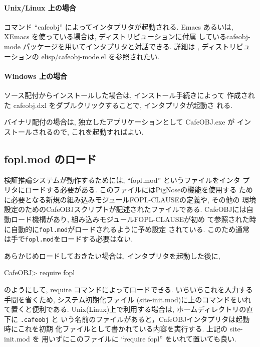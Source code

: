 \paragraph{Unix/Linux 上の場合}

コマンド ``cafeobj'' によってインタプリタが起動される.
Emacs あるいは, XEmacs を使っている場合は, ディストリビューションに付属
しているcafeobj-mode パッケージを用いてインタプリタと対話できる. 詳細は
, ディストリビューションの elisp/cafeobj-mode.el を参照されたい.

\paragraph{Windows 上の場合}

ソース配付からインストールした場合は, インストール手続きによって
作成された cafeobj.dxl をダブルクリックすることで, インタプリタが起動さ
れる. 

バイナリ配付の場合は, 独立したアプリケーションとして CafeOBJ.exe が
インストールされるので, これを起動すればよい.

\subsection{fopl.mod のロード}
\label{sec:fopl-loading}

検証推論システムが動作するためには, ``fopl.mod'' というファイルをインタ
プリタにロードする必要がある. このファイルにはPigNoseの機能を使用する
ために必要となる新規の組み込みモジュールFOPL-CLAUSEの定義や, その他の
環境設定のためのCafeOBJスクリプトが記述されたファイルである.
CafeOBJには自動ロード機構があり, 組み込みモジュールFOPL-CLAUSEが初め
て参照された時に自動的に\texttt{fopl.mod}がロードされるように予め設定
されている. このため通常は手で\texttt{fopl.mod}をロードする必要はない.  

あらかじめロードしておきたい場合は, インタプリタを起動した後に, 
\begin{vvtm}
\begin{examplev}
  CafeOBJ> require fopl
\end{examplev}
\end{vvtm}
のようにして, require コマンドによってロードできる. 
いちいちこれを入力する手間を省くため, システム初期化ファイル
(site-init.mod)に上のコマンドをいれて置くと便利である.
Unix(Linux)上で利用する場合は, ホームディレクトリの直下に \texttt{.cafeobj} と
いう名前のファイルがあると，CafeOBJインタプリタは起動時にこれを初期
化ファイルとして書かれている内容を実行する. 上記の site-init.mod を
用いずにこのファイルに ``require fopl'' をいれて置いても良い.

